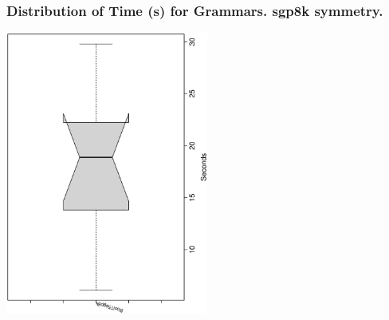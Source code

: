  \begin{frame}
 \frametitle{ Distribution of Time (s) for Grammars. sgp8k  symmetry. }
 \begin{center}
\includegraphics[width=0.5\textwidth, angle=-90]
{ExpFboxplottSeconds006.eps}
 \end{center}
 \label{ExpFboxplottSeconds006.eps}  
 \end{frame}

